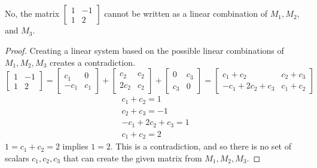 \documentclass[]{article}
\newcommand{\bmat}[1]{\begin{bmatrix}#1\end{bmatrix}}
\begin{document}
\subsection{}
No, the matrix $\left[\begin{smallmatrix}1&-1\\1&2\end{smallmatrix}\right]$ cannot be written as a linear combination of $M_1, M_2,$ and $M_3$.
\begin{proof}
	Creating a linear system based on the possible linear combinations of $M_1, M_2, M_3$ creates a contradiction.
	\begin{equation}
		\bmat{1&-1\\1&2} = \bmat{c_1&0\\-c_1 & c_1} + \bmat{c_2&c_2\\2c_2&c_2} + \bmat{0&c_3\\c_3&0} = \bmat{c_1 + c_2&c_2 + c_3\\-c_1 + 2c_2 + c_3&c_1 + c_2}
	\end{equation}
	\begin{align*}
		c_1 + c_2 = 1\\
		c_2 + c_3 = -1\\
		-c_1 + 2c_2 + c_3 = 1\\
		c_1 + c_2 = 2
	\end{align*}
	$1 = c_1 + c_2 = 2$ implies $1 = 2$. This is a contradiction, and so there is no set of scalars $c_1,c_2,c_3$ that can create the given matrix from $M_1,M_2,M_3$.
\end{proof}
\end{document}
